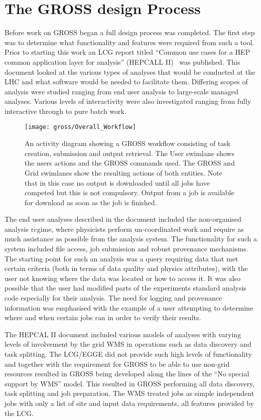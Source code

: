 \section{The GROSS design Process}
Before work on GROSS began a full design process was completed. The first step was to determine what functionality and features were required from such a tool. Prior to starting this work an LCG report titled ``Common use cases for a HEP common application layer for analysis'' (HEPCALL II)~\cite{LHC-SC2-20-2002} was published. This document looked at the various types of analyses that would be conducted at the LHC and what software would be needed to facilitate them. Differing scopes of analysis were studied ranging from end user analysis to large-scale managed analyses. Various levels of interactivity were also investigated ranging from fully interactive through to pure batch work.

\begin{figure}[tbp]
  \centering
  \texttt{[image: gross/Overall\_Workflow]}
  \caption{An activity diagram showing a GROSS workflow consisting of task creation, submission and output retrieval. The User swimlane shows the users actions and the GROSS commands used. The GROSS and Grid swimlanes show the resulting actions of both entities. Note that in this case no output is downloaded until all jobs have competed but this is not compulsory. Output from a job is available for download as soon as the job is finished.
  \label{fig:Overall_Workflow}}
\end{figure}

The end user analyses described in the document included the non-organised analysis r$\acute{e}$gime, where physicists perform un-coordinated work and require as much assistance as possible from the analysis system. The functionality for such a system included file access, job submission and robust provenance mechanisms. The starting point for such an analysis was a query requiring data that met certain criteria (both in terms of data quality and physics attributes), with the user not knowing where the data was located or how to access it. It was also possible that the user had modified parts of the experiments standard analysis code especially for their analysis. The need for logging and provenance information was emphasised with the example of a user attempting to determine where and when certain jobs ran in order to verify their results.

The HEPCAL II document included various models of analyses with varying levels of involvement by the grid WMS in operations such as data discovery and task splitting. The LCG/EGGE did not provide such high levels of functionality and together with the requirement for GROSS to be able to use non-grid resources resulted in GROSS being developed along the lines of the ``No special support by WMS'' model. This resulted in GROSS performing all data discovery, task splitting and job preparation. The WMS treated jobs as simple independent jobs with only a list of site and input data requirements, all features provided by the LCG.

